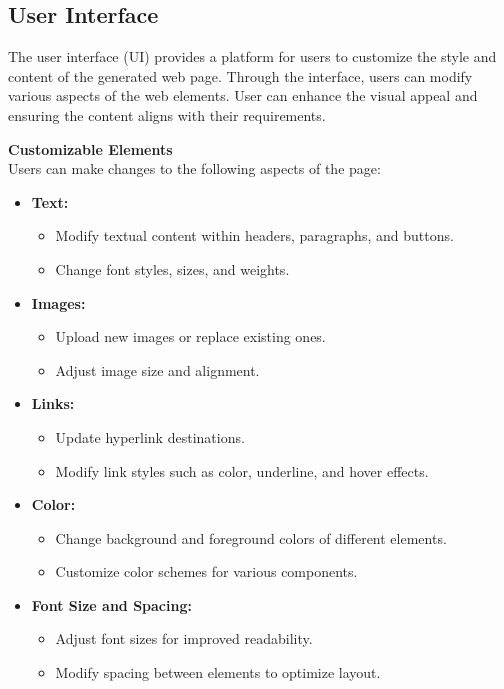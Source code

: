 \subsection{User Interface}
The user interface (UI) provides a platform for users to customize the style and content of the generated web page. Through the interface, users can modify various aspects of the web elements. User can enhance the visual appeal and ensuring the content aligns with their requirements.

\textbf{Customizable Elements}\\
Users can make changes to the following aspects of the page:
\begin{itemize}
    \item \textbf{Text:}
    \begin{itemize}
        \item Modify textual content within headers, paragraphs, and buttons.
        \item Change font styles, sizes, and weights.
    \end{itemize}

    \item \textbf{Images:}
    \begin{itemize}
        \item Upload new images or replace existing ones.
        \item Adjust image size and alignment.
    \end{itemize}

    \item \textbf{Links:}
    \begin{itemize}
        \item Update hyperlink destinations.
        \item Modify link styles such as color, underline, and hover effects.
    \end{itemize}

    \item \textbf{Color:}
    \begin{itemize}
        \item Change background and foreground colors of different elements.
        \item Customize color schemes for various components.
    \end{itemize}

    \item \textbf{Font Size and Spacing:}
    \begin{itemize}
        \item Adjust font sizes for improved readability.
        \item Modify spacing between elements to optimize layout.
    \end{itemize}
\end{itemize}


